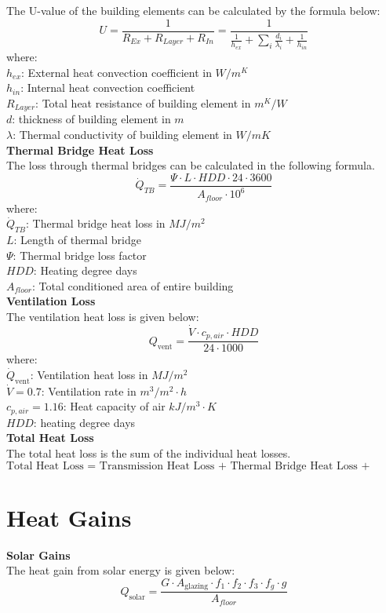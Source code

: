 \documentclass[a4paper, oneside]{discothesis}
\begin{document}
		The U-value of the building elements can be calculated by the formula below: \\
		\[U = \frac{1}{R_{Ex}+R_{Layer}+R_{In}} = \frac{1}{\frac{1}{h_{ex}}+\sum_{i}\frac{d_i}{\lambda_i} + \frac{1}{h_{in}}}\]
		where:\\
		$h_{ex}$: External heat convection coefficient in $W/m^K$\\
		$h_{in}$: Internal heat convection coefficient\\
		$R_{Layer}$: Total heat resistance of building element in $m^K/W$\\
		$d$: thickness of building element in $m$\\
		$\lambda$: Thermal conductivity of building element in $W/mK$\\


	\textbf{Thermal Bridge Heat Loss}\\
		The loss through thermal bridges can be calculated in the following formula.\\
		\[\dot{Q}_{TB} = \frac{\Psi \cdot L \cdot HDD \cdot 24 \cdot 3600}{A_{floor} \cdot 10^6}\]
		where:\\
		$\dot{Q}_{TB}$: Thermal bridge heat loss in $MJ/m^2$\\
		$L$: Length of thermal bridge\\
		$\Psi$: Thermal bridge loss factor\\ 
		$HDD$: Heating degree days\\
		$A_{floor}$: Total conditioned area of entire building\\


	\textbf{Ventilation Loss}\\
		The ventilation heat loss is given below:\\
		\[Q_{\text{vent}} = \frac{\dot{V} \cdot c_{p,air} \cdot HDD}{24 \cdot 1000}\]
		where:\\
		$\dot{Q}_{\text{vent}}$: Ventilation heat loss in $MJ/m^2$\\
		$\dot{V} = 0.7$: Ventilation rate in $m^3/m^2\cdot h$\\
		$c_{p,air} = 1.16$: Heat capacity of air $kJ/m^3 \cdot K$\\
		$HDD$: heating degree days\\
	
	\textbf{Total Heat Loss}\\
	The total heat loss is the sum of the individual heat losses.
	\[\text{Total Heat Loss = Transmission Heat Loss + Thermal Bridge Heat Loss + Ventilation Loss}\]
	\newpage
	\section{Heat Gains}
	\textbf{Solar Gains}\\
	The heat gain from solar energy is given below: \\
	\[Q_{\text{solar}} = \frac{G \cdot A_{\text{glazing}} \cdot f_1 \cdot f_2 \cdot f_3 \cdot f_g \cdot g}{A_{floor}} \]
\end{document}

